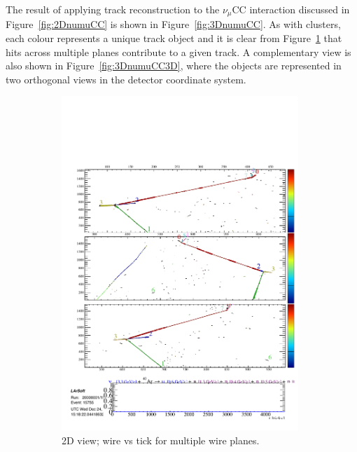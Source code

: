The result of applying track reconstruction to the $\nu_{\mu}$CC interaction discussed in Figure~\ref{fig:2DnumuCC} is shown in Figure~\ref{fig:3DnumuCC}.  As with clusters, each colour represents a unique track object and it is clear from Figure~\ref{fig:3DnumuCC2D} that hits across multiple planes contribute to a given track.  A complementary view is also shown in Figure~\ref{fig:3DnumuCC3D}, where the objects are represented in two orthogonal views in the detector coordinate system.

\begin{figure}
  \centering
  \begin{subfigure}[t]{0.48\linewidth}
    \centering
    \includegraphics[width=0.98\textwidth]{3DnumuCC2D.pdf}
    \caption{2D view; wire vs tick for multiple wire planes.}
    \label{fig:3DnumuCC2D}
  \end{subfigure}
  \hfill
  \begin{subfigure}[t]{0.48\linewidth}

\end{subfigure}
\end{figure}
